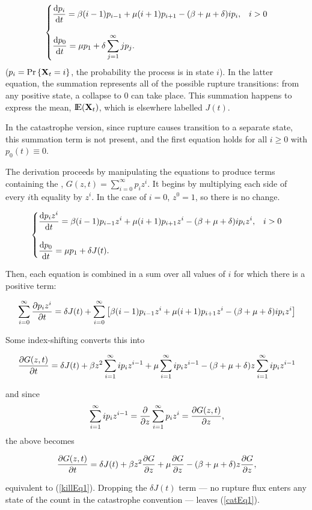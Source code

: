 $$\begin{cases}
    \displaystyle\frac{{\rm d} p_i}{{\rm d} t} = \beta (i-1) p_{i-1} + \mu (i+1) p_{i+1} - (\beta + \mu + \delta)ip_i, & i > 0\\
   \\
    \displaystyle\frac{{\rm d} p_0}{{\rm d} t} = \mu p_1 +  \delta\sum^\infty_{j=1} jp_j.
\end{cases}$$
($p_i = {\text{Pr}\left\{{{\bf X}_t} = i\right\}}$, the probability the process is in state $i$). In the
latter equation, the summation represents all of the possible rupture
transitions: from any positive state, a collapse to $0$ can take place. This
summation happens to express the mean, ${\rm I}\!{\rm E}({{\bf X}_t})$, which is elsewhere
labelled $J(t)$.\par
In the catastrophe version, since rupture causes transition to a separate
state, this summation term is not present, and the first equation holds for
all $i\ge0$ with $p_0(t)\equiv0$.\par
\vspace{10pt}

\noindent
The derivation proceeds by manipulating the equations to produce terms
containing the \pgf, $G(z, t) = \sum^\infty_{i=0}p_i z^i$. It begins by
multiplying each side of every $i$th equality by $z^i$. In the case of
$i=0$, $z^0 = 1$, so there is no change.

$$\begin{cases}
    \displaystyle\frac{{\rm d} p_iz^i}{{\rm d} t} = \beta (i-1) p_{i-1}z^i + \mu (i+1) p_{i+1}z^i - (\beta + \mu + \delta)ip_iz^i, & i > 0\\
   \\
    \displaystyle\frac{{\rm d} p_0}{{\rm d} t} = \mu p_1 +  \delta J(t).
\end{cases}$$

\noindent
Then, each equation is combined in a sum over all values of $i$ for which
there is a positive term:

$$
\sum^\infty_{i=0} \displaystyle\frac{\partial p_iz^i}{\partial t} = \delta J(t)   + \sum^\infty_{i=0}\left[ \beta (i-1) p_{i-1}z^i + \mu (i+1) p_{i+1}z^i - (\beta + \mu + \delta)ip_iz^i\right]$$

\noindent
Some index-shifting converts this into

$$\displaystyle\frac{\partial G(z,t)}{\partial t} = \delta J(t) + \beta z^2 \sum^\infty_{i=1} ip_iz^{i-1} + \mu\sum^\infty_{i=1}ip_iz^{i-1} - (\beta +\mu+\delta)z\sum^\infty_{i=1}ip_iz^{i-1}$$

\noindent
and since
$$\sum^\infty_{i=1} ip_iz^{i-1}  = \displaystyle\frac{\partial }{\partial z}\sum^\infty_{i=1} p_iz^{i} = \displaystyle\frac{\partial G(z,t)}{\partial z},$$
the above becomes

$$\displaystyle\frac{\partial G(z,t)}{\partial t} = \delta J(t) +  \beta z^2\displaystyle\frac{\partial G}{\partial z}  + \mu\displaystyle\frac{\partial G}{\partial z} - (\beta + \mu + \delta)z\displaystyle\frac{\partial G}{\partial z},$$

\noindent
equivalent to (\ref{killEq1}). Dropping the $\delta J(t)$ term --- no
rupture flux enters any state of the count in the catastrophe convention ---
leaves (\ref{catEq1}).
